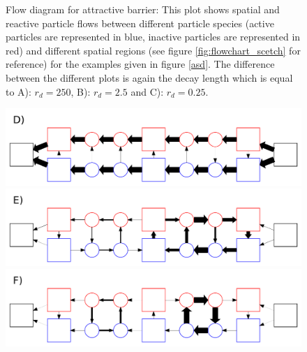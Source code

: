\begin{minipage}[t]{.372 \textwidth}
    \vspace{.5 cm}
    \begin{figure}[H]
        \caption{Flow diagram for attractive barrier: This plot shows spatial and reactive particle flows between different particle species (active particles are represented in blue, inactive particles are represented in red) and different spatial regions (see figure \ref{fig:flowchart_scetch} for reference) for the examples given in figure \ref{asd}. The difference between the different plots is again the decay length which is equal to \newline A): $r_d=250$, B): $r_d=2.5$ and \newline C): $r_d = 0.25$.
    \label{fig:flow_attractive}}
    \end{figure}
\end{minipage}\hspace{0.02 \textwidth}\begin{minipage}[t]{.608 \textwidth}
    \begin{figure}[H]
        \includegraphics[width = 1 \textwidth]{plots/att_flowchart0.pdf}
        \includegraphics[width = 1 \textwidth]{plots/att_flowchart1.pdf}
        \includegraphics[width = 1 \textwidth]{plots/att_flowchart2.pdf}
    \end{figure}
\end{minipage}
\vspace{.5 cm} \\
